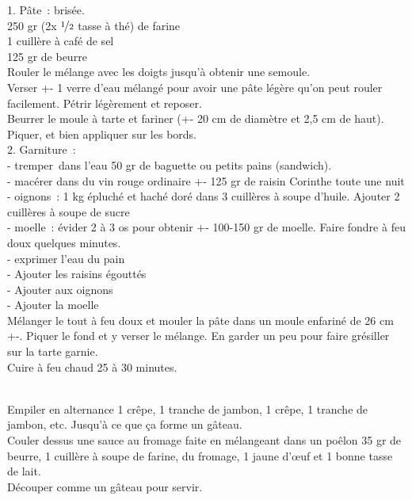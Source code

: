 \begin{minipage}[c]{\textwidth}
1. Pâte : brisée. \\
250 gr (2x $\nicefrac{1}{2}$ tasse à thé) de farine\\
1 cuillère à café de sel\\
125 gr de beurre\\
Rouler le mélange avec les doigts jusqu’à obtenir une semoule. \\
Verser +- 1 verre d’eau mélangé pour avoir une pâte légère qu’on peut rouler facilement. Pétrir légèrement et reposer. \\
Beurrer le moule à tarte et fariner (+- 20 cm de diamètre et 2,5 cm de haut). Piquer, et bien appliquer sur les bords. \\
2. Garniture :\\
- tremper dans l’eau 50 gr de baguette ou petits pains (sandwich). \\
- macérer dans du vin rouge ordinaire +- 125 gr de raisin Corinthe toute une nuit\\
- oignons : 1 kg épluché et haché doré dans 3 cuillères à soupe d’huile. Ajouter 2 cuillères à   soupe de sucre\\
- moelle : évider 2 à 3 os pour obtenir +- 100-150 gr de moelle. Faire fondre à feu doux quelques minutes. \\
- exprimer l’eau du pain\\
- Ajouter les raisins égouttés\\
- Ajouter aux oignons\\
- Ajouter la moelle\\
Mélanger le tout à feu doux et mouler la pâte dans un moule enfariné de 26 cm +-. Piquer le fond et y verser le mélange. En garder un peu pour faire grésiller sur la tarte garnie. \\
Cuire à feu chaud 25 à 30 minutes. \\
\\

\end{minipage}

\begin{minipage}[c]{\textwidth}
Empiler en alternance 1 crêpe, 1 tranche de jambon, 1 crêpe, 1 tranche de jambon, etc. Jusqu’à ce que ça forme un gâteau. \\
Couler dessus une sauce au fromage faite en mélangeant dans un poêlon 35 gr de beurre, 1 cuillère à soupe de farine, du fromage, 1 jaune d’œuf et 1 bonne tasse de lait.\\
Découper comme un gâteau pour servir.\\
\\

\end{minipage}

